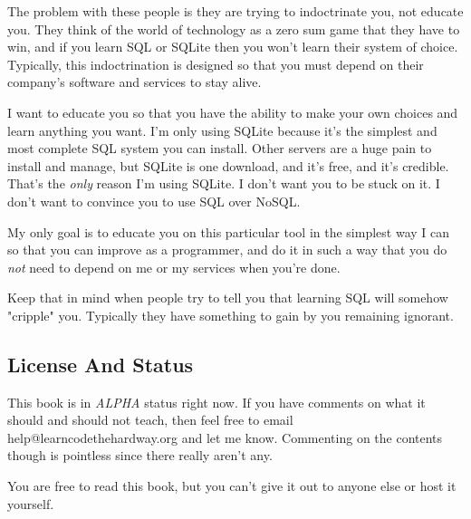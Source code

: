 The problem with these people is they are trying to indoctrinate you, not
educate you.  They think of the world of technology as a zero sum game
that they have to win, and if you learn SQL or SQLite then you won't
learn their system of choice.  Typically, this indoctrination is designed
so that you must depend on their company's software and services to 
stay alive.

I want to educate you so that you have the ability to make your own choices and
learn anything you want.  I'm only using SQLite because it's the simplest and
most complete SQL system you can install.  Other servers are a huge pain to
install and manage, but SQLite is one download, and it's free, and it's
credible. That's the \emph{only} reason I'm using SQLite.  I don't want you to
be stuck on it.  I don't want to convince you to use SQL over NoSQL.

My only goal is to educate you on this particular tool in the simplest way
I can so that you can improve as a programmer, and do it in such a way that
you do \emph{not} need to depend on me or my services when you're done.

Keep that in mind when people try to tell you that learning SQL will somehow
"cripple" you.  Typically they have something to gain by you remaining
ignorant.

\subsection*{License And Status}

This book is in \emph{ALPHA} status right now.  If you have comments on what it
should and should not teach, then feel free to email help@learncodethehardway.org
and let me know.  Commenting on the contents though is pointless since there
really aren't any.

You are free to read this book, but you can't give it out to anyone else or
host it yourself.



